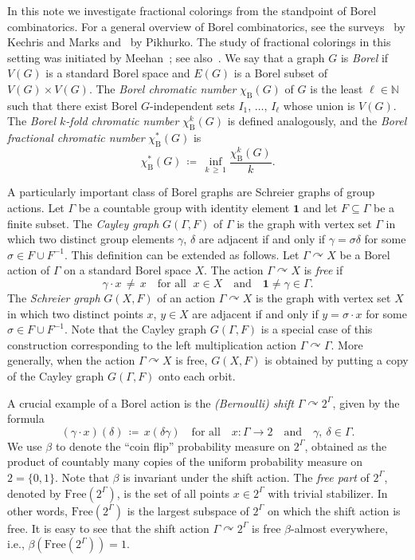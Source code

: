 \documentclass[10pt]{amsart}
\theoremstyle{definition}
\newcommand{\0}{\varnothing}
\newcommand{\set}[1]{\{#1\}}
\renewcommand{\geq}{\geqslant}
\newcommand{\defeq}{\coloneqq}
\newcommand{\N}{{\mathbb{N}}}
\newcommand{\Free}{\mathrm{Free}}
\newcommand{\rmB}{\mathrm{B}}
\newcommand{\bfun}{\mathbf{1}}
\begin{document}
In this note we investigate fractional colorings from the standpoint of Borel combinatorics. For a general overview of Borel combinatorics, see the surveys~\cite{KechrisMarks} by Kechris and Marks and~\cite{Pikh_survey} by Pikhurko. The study of fractional colorings in this setting was initiated by Meehan~\cite{Mee}; see also~\cite[\S~8.6]{KechrisMarks}. We say that a graph $G$ is \emph{Borel} if $V(G)$ is a standard Borel space and $E(G)$ is a Borel subset of $V(G) \times V(G)$. The \emph{Borel chromatic number} $\chi_\rmB(G)$ of $G$ is the least $\ell \in \N$ such that there exist {Borel} $G$-independent sets $I_1,\, \ldots, \,I_\ell$ whose union is $V(G)$. The \emph{Borel $k$-fold chromatic number} $\chi^k_{\rmB}(G)$ is defined analogously, and the \emph{Borel fractional chromatic number} $\chi^\ast_{\rmB}(G)$ is
\[
\chi^\ast_{\rmB}(G) \,
\defeq\, \inf_{k\,\geq\,1} \frac{\chi^k_{\rmB}(G)}{k}.
\]

A particularly important class of Borel graphs are Schreier graphs of group actions. Let $\Gamma$ be a countable group with identity element $\bfun$ and let $F \subseteq \Gamma$ be a finite subset. The \emph{Cayley graph} $G(\Gamma, F)$ of $\Gamma$ is the graph with vertex set $\Gamma$ in which two distinct group elements $\gamma$, $\delta$ are adjacent if and only if $\gamma =\sigma \delta$ for some $\sigma \in F \cup F^{-1}$. This definition can be extended as follows. Let $\Gamma \curvearrowright X$ be a Borel action of $\Gamma$ on a standard Borel space $X$. The action $\Gamma \curvearrowright X$ is \emph{free} if
\[
\gamma \cdot x \,\neq\, x \quad \text{for all }\; x \in X\quad \text{and}\quad \bfun \neq \gamma \in \Gamma.
\]
The \emph{Schreier graph} $G(X,F)$ of an action $\Gamma \curvearrowright X$ is the graph with vertex set $X$ in which two distinct points $x$, $y \in X$ are adjacent if and only if $y = \sigma \cdot x$ for some $\sigma \in F \cup F^{-1}$. Note that the Cayley graph $G(\Gamma, F)$ is a special case of this construction corresponding to the left multiplication action $\Gamma \curvearrowright \Gamma$. More generally, when the action $\Gamma \curvearrowright X$ is free, $G(X, F)$ is obtained by putting a copy of the Cayley graph $G(\Gamma, F)$ onto each orbit.

A crucial example of a Borel action is the \emph{(Bernoulli) shift} $\Gamma \curvearrowright 2^\Gamma$, given by the formula
\[
(\gamma \cdot x)(\delta) \,
\defeq\, x(\delta \gamma) \quad \text{for all}\quad x \colon \Gamma \to 2 \quad\text{and}\quad \gamma,\ \delta \in \Gamma.
\]
We use $\beta$ to denote the ``coin flip'' probability measure on $2^\Gamma$, obtained as the product of countably many copies of the uniform probability measure on $2 = \set{0,1}$. Note that $\beta$ is invariant under the shift action. The \emph{free part} of $2^\Gamma$, denoted by $\Free(2^\Gamma)$, is the set of all points $x \in 2^\Gamma$ with trivial stabilizer. In other words, $\Free(2^\Gamma)$ is the largest subspace of $2^\Gamma$ on which the shift action is free. It is easy to see that the shift action $\Gamma \curvearrowright 2^\Gamma$ is free $\beta$-almost everywhere, i.e., $\beta(\Free(2^\Gamma)) = 1$.
\end{document}
